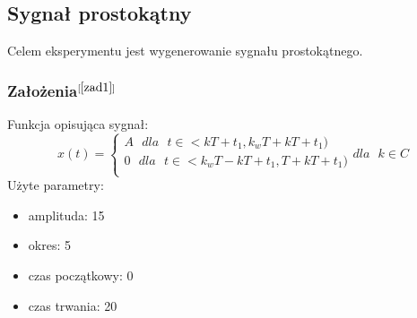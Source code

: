 \documentclass[12pt]{article}
\begin{document}
\subsection{Sygnał prostokątny}
Celem eksperymentu jest wygenerowanie sygnału prostokątnego.
\label{syg2}
\subsubsection{Założenia\( ^{[\ref{zad1}]}\)}
\label{wzor2}
Funkcja opisująca sygnał:
\begin{equation}
x(t) =
\begin{cases}
A\text{ }dla\text{ }t\in <k{T}+t_1,k_w{T}+k{T}+t_1)\\
0\text{ } dla\text{ } t\in <k_wT-kT+t_1,T+kT+t_1)\\
\end{cases}
dla\text{ } k\in C
\end{equation}
Użyte parametry:
\begin{itemize}
\item amplituda: 15
\item okres: 5
\item czas początkowy: 0
\item czas trwania: 20
\end{itemize}
\end{document}
